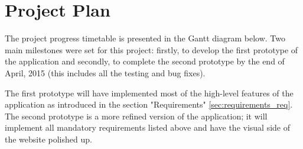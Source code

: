 \section{Project Plan}
\label{projectplan_req}
The project progress timetable is presented in the Gantt diagram below. Two main milestones were set for this project: firstly, to develop the first prototype of the application and secondly, to complete the second prototype by the end of April, 2015 (this includes all the testing and bug fixes).

The first prototype will have implemented most of the high-level features of the application as introduced in the section "Requirements" \ref{sec:requirements_req}. The second prototype is a more refined version of the application; it will implement all mandatory requirements listed above and have the visual side of the website polished up.



